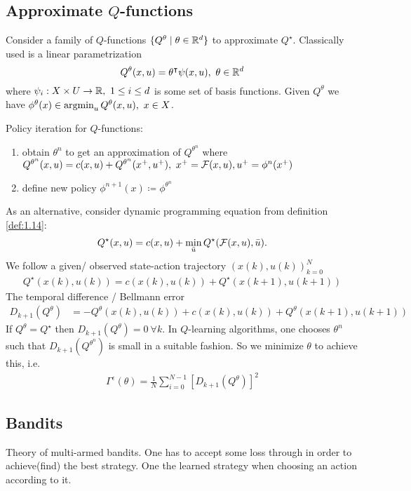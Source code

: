 \subsection{Approximate \(Q\)-functions}
Consider a family of \(Q\)-functions \(\{Q^\theta\mid \theta\in \mathbb{R}^d\}\)
to approximate \(Q^\star\). Classically used is a linear 
parametrization 
\[Q^\theta(x,u)=\theta^\intercal \psi(x,u),\  \theta\in\mathbb{R}^d\]  
where \(\psi_i:X\times U\to\mathbb{R},\ 1\leq i\leq d\) is some set of 
basis functions. 
Given \(Q^\theta\) we have \(\phi^\theta(x)\in\operatorname*{\text{argmin}}_{u}Q^\theta(x,u),\ x\in X\).

Policy iteration for \(Q\)-functions:
\begin{enumerate}
    \item obtain \(\theta^n\) to get an approximation of \(Q^{\theta^n}\)
          where \(Q^{\theta^n}(x,u)=c(x,u)+Q^{\theta^n}(x^+,u^+),\ x^+=\cF(x,u),u^+=\phi^n(x^+)\)
    \item define new policy \(\phi^{n+1}(x)\coloneqq \phi^{\theta^n}\) 
\end{enumerate}

As an alternative, consider dynamic programming equation from definition \ref{def:1.14}:
\begin{align*}
    Q^\star(x,u)=c(x,u)+\min_{\bar{u}}Q^\star(\mathcal{F}(x,u),\bar{u}).
\end{align*}
We follow a given/ observed state-action trajectory \((x(k),u(k))_{k=0}^N\)
\begin{align*}
    Q^\star(x(k),u(k))=c(x(k),u(k))+Q^\star(x(k+1),u(k+1))
\end{align*}
The temporal difference / Bellmann error 
\begin{align*}
    D_{k+1}(Q^\theta)&=-Q^\theta(x(k),u(k))+c(x(k),u(k))+Q^\theta(x(k+1),u(k+1))
\end{align*} 
If \(Q^\theta=Q^\star\) then \(D_{k+1}(Q^\theta)=0\ \forall k\). In \(Q\)-learning 
algorithms, one chooses \(\theta^n\) such that \(D_{k+1}(Q^{\theta^n})\)
is small in a suitable fashion. So we minimize \(\theta\) to achieve this, i.e. 
\begin{align*}
    \Gamma^\epsilon(\theta)=\frac{1}{N}\sum_{i=0}^{N-1}[D_{k+1}(Q^\theta)]^2
\end{align*} 

\subsection{Bandits}
Theory of multi-armed bandits. One has to accept some 
loss through  in order to achieve(find) the best strategy.
One  the learned strategy when choosing an action according to it.

